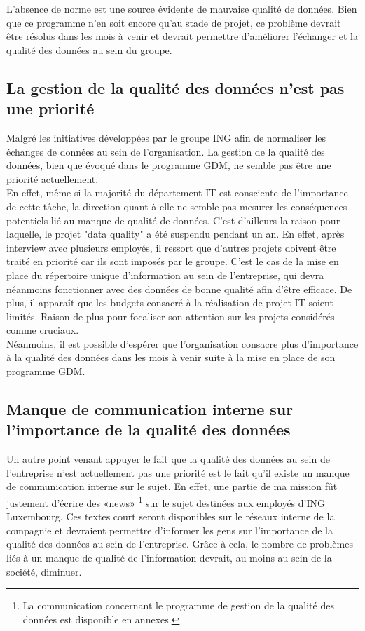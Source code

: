 \documentclass[a4paper, 12pt, french]{article}
\begin{document}
L'absence de norme est une source évidente de mauvaise qualité de données. Bien que ce programme n'en soit encore qu'au stade de projet, ce problème devrait être résolus dans les mois à venir et devrait permettre d'améliorer l'échanger et la qualité des données au sein du groupe.

\subsection{La gestion de la qualité des données n'est pas une priorité}

Malgré les initiatives développées par le groupe ING afin de normaliser les échanges de données au sein de l'organisation. La gestion de la qualité des données, bien que évoqué dans le programme GDM, ne semble pas être une priorité actuellement. \\

En effet, même si la majorité du département IT est consciente de l'importance de cette tâche, la direction quant à elle ne semble pas mesurer les conséquences potentiels lié au manque de qualité de données. C’est d’ailleurs la raison pour laquelle, le projet "data quality" a été suspendu pendant un an. En effet, après interview avec plusieurs employés, il ressort que d'autres projets doivent être traité en priorité car ils sont imposés par le groupe. C’est le cas de la mise en place du répertoire unique d’information au sein de l’entreprise, qui devra néanmoins fonctionner avec des données de bonne qualité afin d’être efficace. De plus, il apparaît que les budgets consacré à la réalisation de projet IT soient limités. Raison de plus pour focaliser son attention sur les projets considérés comme cruciaux. \\

Néanmoins, il est possible d’espérer que l’organisation consacre plus d’importance à la qualité des données dans les mois à venir suite à la mise en place de son programme GDM. 

\subsection{Manque de communication interne sur l'importance de la qualité des données}

Un autre point venant appuyer le fait que la qualité des données au sein de l’entreprise n’est actuellement pas une priorité est le fait qu’il existe un manque de communication interne sur le sujet. En effet, une partie de ma mission fût justement d’écrire des «news» \footnote{La communication concernant le programme de gestion de la qualité des données est disponible en annexes.} sur le sujet destinées aux employés d’ING Luxembourg. Ces textes court seront disponibles sur le réseaux interne de la compagnie et devraient permettre d’informer les gens sur l’importance de la qualité des données au sein de l'entreprise. Grâce à cela, le nombre de problèmes liés à un manque de qualité de l’information devrait, au moins au sein de la société, diminuer.
\end{document}
